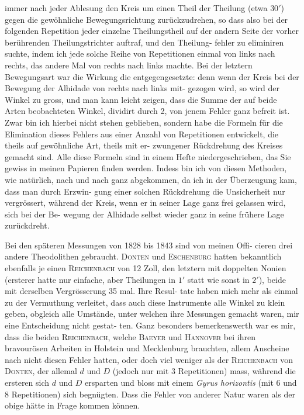 \documentclass[12pt,a4paper]{article}
\theoremstyle{plain}
\theoremstyle{definition}
\theoremstyle{remark}
\begin{document}
\newpage
immer nach jeder Ablesung den Kreis um einen Theil der Theilung (etwa
$30'$) gegen die gewöhnliche Bewegungsrichtung zurückzudrehen, so dass also
bei der folgenden Repetition jeder einzelne Theilungstheil auf der andern
Seite der vorher berührenden Theilungstrichter auftraf, und den Theilung-
fehler zu eliminiren suchte, indem ich jede solche Reihe von Repetitionen
einmal von links nach rechts, das andere Mal von rechts nach links machte.
Bei der letztern Bewegungsart war die Wirkung die entgegengesetzte: denn
wenn der Kreis bei der Bewegung der Alhidade von rechts nach links mit-
gezogen wird, so wird der Winkel zu gross, und man kann leicht zeigen,
dass die Summe der auf beide Arten beobachteten Winkel, dividirt durch 2,
von jenem Fehler ganz befreit ist. Zwar bin ich hierbei nicht stehen geblieben,
sondern habe die Formeln für die Elimination dieses Fehlers aus einer Anzahl
von Repetitionen entwickelt, die theils auf gewöhnliche Art, theils mit er-
zwungener Rückdrehung des Kreises gemacht sind. Alle diese Formeln sind
in einem Hefte niedergeschrieben, das Sie gewiss in meinen Papieren finden
werden. Indess bin ich von diesen Methoden, wie natürlich, nach und nach
ganz abgekommen, da ich in der Überzeugung kam, dass man durch Erzwin-
gung einer solchen Rückdrehung die Unsicherheit nur vergrössert, während
der Kreis, wenn er in seiner Lage ganz frei gelassen wird, sich bei der Be-
wegung der Alhidade selbst wieder ganz in seine frühere Lage zurückdreht.

Bei den späteren Messungen von 1828 bis 1843 sind von meinen Offi-
cieren drei andere Theodolithen gebraucht. \textsc{Donten} und \textsc{Eschenburg}
 hatten
bekanntlich ebenfalls je einen \textsc{Reichenbach} von 12 Zoll, den letztern mit
doppelten Nonien (ersterer hatte nur einfache, aber Theilungen in $1'$ statt
wie sonst in $2'$), beide mit derselben Vergrösserung 35 mal. Ihre Resul-
tate haben mich mehr als einmal zu der Vermuthung verleitet, dass auch
diese Instrumente alle Winkel zu klein geben, obgleich alle Umstände, unter
welchen ihre Messungen gemacht waren, mir eine Entscheidung nicht gestat-
ten. Ganz besonders bemerkenswerth war es mir, dass die beiden \textsc{Reichenbach},
welche \textsc{Baeyer} und \textsc{Hannover} bei ihren bravourösen Arbeiten in Holstein
und Mecklenburg brauchten, allem Anscheine nach nicht diesen Fehler hatten,
oder doch viel weniger als der \textsc{Reichenbach} von \textsc{Donten}, der allemal
$d$ und $D$ (jedoch nur mit 3 Repetitionen) mass, während die ersteren sich
$d$ und $D$ ersparten und bloss mit einem \textit{Gyrus horizontis} (mit 6 und 8
Repetitionen) sich begnügten. Dass die Fehler von anderer Natur waren als
der obige hätte in Frage kommen können.
\end{document}

